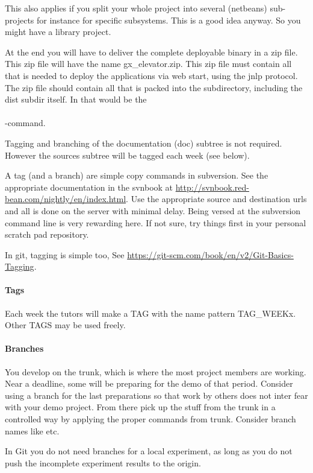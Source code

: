 This also applies if you split your whole project into several
(netbeans) sub-projects for instance for specific subsystems. This is
a good idea anyway. So you might have a  library
project.

At the end you will have to deliver the complete deployable binary in
a zip file. This zip file will have the name gx\_elevator.zip. This
zip file must contain all that is needed to deploy the applications
via web start, using the jnlp protocol. The zip file should contain all
that is packed into the  subdirectory, including the dist
subdir itself. In \Linux that would be the \\
\\
-command.

Tagging and branching of the documentation (doc) subtree is not required.
However the sources subtree will be tagged each week (see below).

A tag (and a branch) are simple copy commands in subversion. See the
appropriate documentation in the svnbook at
\url{http://svnbook.red-bean.com/nightly/en/index.html}. Use
the appropriate source and destination urls and all is done on the
server with minimal delay. Being versed at the subversion command line
is very rewarding here. If not sure, try things first in your
personal scratch pad repository.

In git, tagging is simple too, See \url{https://git-scm.com/book/en/v2/Git-Basics-Tagging}.

\paragraph{Tags} Each week the tutors will make a TAG with the name
pattern TAG\_WEEKx. Other TAGS may be used freely.

\paragraph{Branches} You develop on the trunk, which is where the most
project members are working. Near a deadline, some will be preparing
for the demo of that period. Consider using a branch for the last
preparations so that work by others does not inter fear with your demo
project. From there pick up the stuff from the trunk in a controlled
way by applying the proper  commands from trunk.
Consider branch names like  etc.

In Git you do not need branches for a local experiment, as long as you
do not push the incomplete experiment results to the origin.


